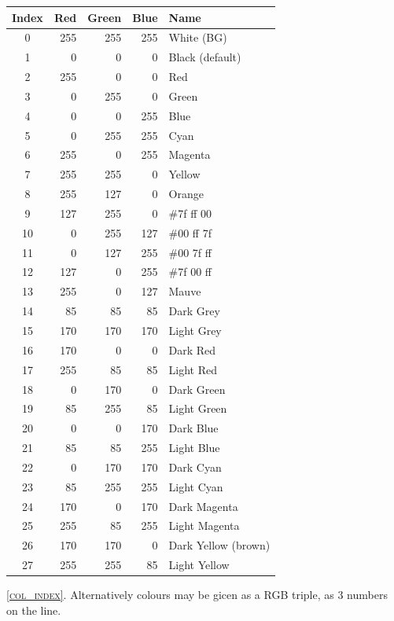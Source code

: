 \documentclass[11pt,twoside,english]{article}
\begin{document}
\begin{description}
\begin{description}
\begin{table}[!ht]
      \begin{center}
        \begin{tabular}{|c|rrr|l|}
          \hline 
          Index&      Red&      Green&      Blue&      Name\\
          \hline 
          0&      255&      255&      255&      White (BG)\\
          1&      0&      0&      0&      Black (default)\\
          2&      255&      0&      0&      Red\\
          3&      0&      255&      0&      Green\\
          4&      0&      0&      255&      Blue\\
          5&      0&      255&      255&      Cyan\\
          6&      255&      0&      255&      Magenta\\
          7&      255&      255&      0&      Yellow\\
          8&      255&      127&      0&      Orange\\
          9&      127&      255&      0&      \#7f ff 00\\
          10&      0&      255&      127&     \#00 ff 7f \\
          11&      0&      127&      255&    \#00 7f ff \\
          12&      127&      0&      255&     \#7f 00 ff \\
          13&      255&      0&      127&      Mauve\\
          14&      85&      85&      85&      Dark Grey\\
          15&      170&      170&      170&      Light Grey\\
          16 & 170 & 0 & 0 & Dark Red\\
          17 & 255 & 85 & 85 & Light Red\\
          18 & 0 & 170 & 0 & Dark Green\\
          19 & 85 & 255 & 85 & Light Green\\
          20 & 0 & 0 & 170 & Dark Blue\\
          21 & 85 & 85 & 255 & Light Blue\\
          22 & 0 & 170 & 170 & Dark Cyan\\
          23 & 85 & 255 & 255 & Light Cyan\\
          24 & 170 & 0 & 170 & Dark Magenta\\
          25 & 255 & 85 & 255 & Light Magenta\\
          26 & 170 & 170 & 0 & Dark Yellow (brown)\\
          27 & 255 & 255 & 85 & Light Yellow\\
          \hline
        \end{tabular}
      \end{center}
    \end{table}
    \textsc{\autoref{col_index}}. Alternatively colours may be gicen
    as a RGB triple, as 3 numbers on the line.


\end{description}
\end{description}
\end{document}
